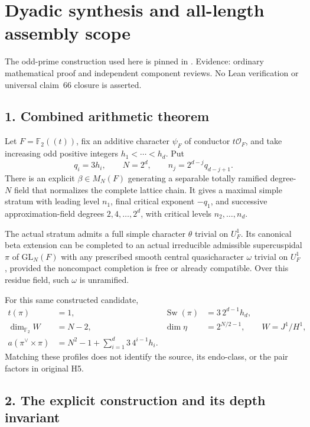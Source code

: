 \clearpage
\section{Dyadic synthesis and all-length assembly scope}\label{app:dyadic_synthesis}

The odd-prime construction used here is pinned in
. Evidence: ordinary mathematical proof and
independent component reviews. No Lean verification or universal claim~66
closure is asserted.

\hypertarget{dyadic_synthesis-combined-arithmetic-theorem}{%
\subsection{1. Combined arithmetic
theorem}\label{dyadic_synthesis-combined-arithmetic-theorem}}

Let \(F=\mathbb F_2((t))\), fix an additive character \(\psi_F\) of
conductor \(t\mathcal O_F\), and take increasing odd positive integers
\(h_1<\cdots<h_d\). Put \[
q_i=3h_i,\qquad N=2^d,\qquad n_j=2^{d-j}q_{d-j+1}.
\] There is an explicit \(\beta\in M_N(F)\) generating a separable
totally ramified degree-\(N\) field that normalizes the complete lattice
chain. It gives a maximal simple stratum with leading level \(n_1\),
final critical exponent \(-q_1\), and successive approximation-field
degrees \(2,4,\ldots,2^d\), with critical levels \(n_2,\ldots,n_d\).

The actual stratum admits a full simple character \(\theta\) trivial on
\(U_F^1\). Its canonical beta extension can be completed to an actual
irreducible admissible supercuspidal \(\pi\) of \(\mathrm{GL}_N(F)\)
with any prescribed smooth central quasicharacter \(\omega\) trivial on
\(U_F^1\), provided the noncompact completion is free or already
compatible. Over this residue field, such \(\omega\) is unramified.

For this same constructed candidate, \[
\begin{aligned}
t(\pi)&=1,& \operatorname{Sw}(\pi)&=3\,2^{d-1}h_d,\\
\dim_{\mathbb F_2}W&=N-2,&
\dim\eta&=2^{N/2-1},\qquad W=J^1/H^1,\\
a(\pi^\vee\times\pi)
 &=N^2-1+\sum_{i=1}^d3\,4^{i-1}h_i.
\end{aligned}
\] Matching these profiles does not identify the source, its endo-class,
or the pair factors in original H5.

\hypertarget{dyadic_synthesis-the-explicit-construction-and-its-depth-invariant}{%
\subsection{2. The explicit construction and its depth
invariant}\label{dyadic_synthesis-the-explicit-construction-and-its-depth-invariant}}

